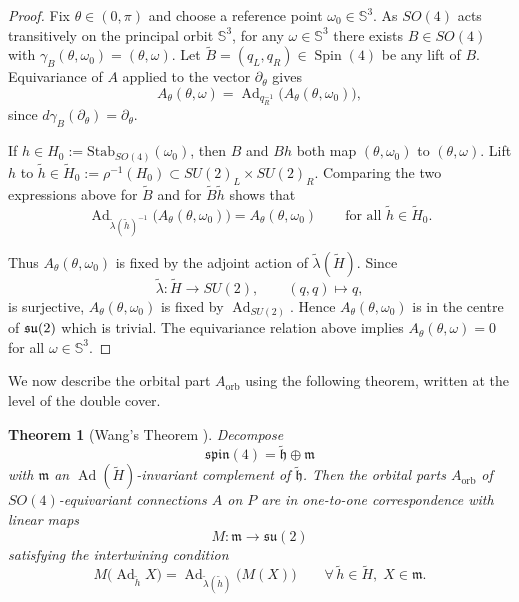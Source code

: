 \documentclass[11pt,a4paper]{article}
\numberwithin{equation}{section}
\theoremstyle{plain}
\newtheorem{theorem}{Theorem}[section]
\theoremstyle{remark}
\begin{document}
\begin{proof}
    Fix $\theta\in(0,\pi)$ and choose a reference point
    $\omega_0\in \mathbb{S}^3$. As $SO(4)$ acts transitively on the principal
    orbit $\mathbb{S}^3$, for any $\omega\in \mathbb{S}^3$ there exists
    $B\in SO(4)$ with $\gamma_B(\theta,\omega_0)=(\theta,\omega)$.
    Let $\widetilde B=(q_L,q_R)\in\operatorname{Spin}(4)$ be any lift of $B$.
    Equivariance of $A$ applied to the vector
    $\partial_\theta$ gives
    $$
    A_\theta(\theta,\omega)
    =
    \operatorname{Ad}_{q_R^{-1}}\bigl(A_\theta(\theta,\omega_0)\bigr),
    $$
    since $d\gamma_B(\partial_\theta)=\partial_\theta$.

    If $h\in H_0:=\mathrm{Stab}_{SO(4)}(\omega_0)$, then $B$ and $Bh$
    both map $(\theta,\omega_0)$ to $(\theta,\omega)$. Lift $h$ to
    $\widetilde h\in\widetilde H_0:=\rho^{-1}(H_0)\subset
    SU(2)_L\times SU(2)_R$. Comparing the two expressions above for
    $\widetilde B$ and for $\widetilde B\widetilde h$ shows that
    $$
    \operatorname{Ad}_{\widetilde\lambda(\widetilde h)^{-1}}
    \bigl(A_\theta(\theta,\omega_0)\bigr)
    =
    A_\theta(\theta,\omega_0)
    \qquad\text{for all }\widetilde h\in\widetilde H_0.
    $$

    Thus $A_\theta(\theta,\omega_0)$ is fixed by the adjoint action of
    $\widetilde\lambda(\widetilde H)$. Since
    $$
    \widetilde\lambda:\widetilde H\longrightarrow SU(2),
    \qquad
    (q,q)\longmapsto q,
    $$
    is surjective, $A_\theta(\theta,\omega_0)$ is fixed by
    $\operatorname{Ad}_{SU(2)}$. Hence $A_\theta(\theta,\omega_0)$ is in the centre of $\frak{su}(2)$ which is trivial. The equivariance relation above
    implies $A_\theta(\theta,\omega)=0$ for all
    $\omega\in\mathbb S^3$.
\end{proof}

\noindent
We now describe the orbital part $A_{\mathrm{orb}}$ using the following theorem, written at the level of the double cover.

\begin{theorem}[Wang's Theorem \cite{Wang1958}]
Decompose
$$
\mathfrak{spin}(4)=\widetilde{\mathfrak h}\oplus\mathfrak m
$$
with $\mathfrak m$ an
$\operatorname{Ad}(\widetilde H)$-invariant complement of
$\widetilde{\mathfrak h}$. Then the orbital parts
$A_{\mathrm{orb}}$ of $SO(4)$-equivariant connections $A$ on
$P$ are in one-to-one correspondence with linear maps
$$
M:\mathfrak m\longrightarrow\mathfrak{su}(2)
$$
satisfying the intertwining condition
\begin{equation}\label{intertwiner}
M\bigl(\operatorname{Ad}_{\widetilde h}X\bigr)
=
\operatorname{Ad}_{\widetilde\lambda(\widetilde h)}
\bigl(M(X)\bigr)
\qquad
\forall\,\widetilde h\in\widetilde H,\;
X\in\mathfrak m.
\end{equation}
\end{theorem}
\end{document}
